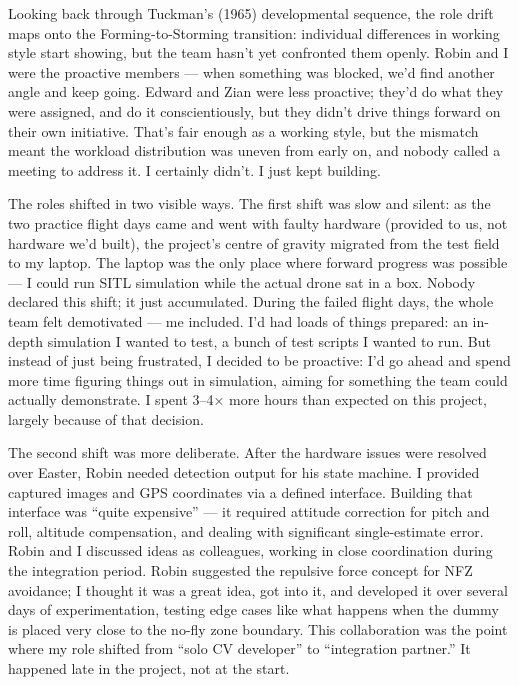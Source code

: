 Looking back through Tuckman's (1965) developmental sequence, the role drift maps onto the Forming-to-Storming transition: individual differences in working style start showing, but the team hasn't yet confronted them openly. Robin and I were the proactive members --- when something was blocked, we'd find another angle and keep going. Edward and Zian were less proactive; they'd do what they were assigned, and do it conscientiously, but they didn't drive things forward on their own initiative. That's fair enough as a working style, but the mismatch meant the workload distribution was uneven from early on, and nobody called a meeting to address it. I certainly didn't. I just kept building.

The roles shifted in two visible ways. The first shift was slow and silent: as the two practice flight days came and went with faulty hardware (provided to us, not hardware we'd built), the project's centre of gravity migrated from the test field to my laptop. The laptop was the only place where forward progress was possible --- I could run SITL simulation while the actual drone sat in a box. Nobody declared this shift; it just accumulated. During the failed flight days, the whole team felt demotivated --- me included. I'd had loads of things prepared: an in-depth simulation I wanted to test, a bunch of test scripts I wanted to run. But instead of just being frustrated, I decided to be proactive: I'd go ahead and spend more time figuring things out in simulation, aiming for something the team could actually demonstrate. I spent 3--4$\times$ more hours than expected on this project, largely because of that decision.

The second shift was more deliberate. After the hardware issues were resolved over Easter, Robin needed detection output for his state machine. I provided captured images and GPS coordinates via a defined interface. Building that interface was ``quite expensive'' --- it required attitude correction for pitch and roll, altitude compensation, and dealing with significant single-estimate error. Robin and I discussed ideas as colleagues, working in close coordination during the integration period. Robin suggested the repulsive force concept for NFZ avoidance; I thought it was a great idea, got into it, and developed it over several days of experimentation, testing edge cases like what happens when the dummy is placed very close to the no-fly zone boundary. This collaboration was the point where my role shifted from ``solo CV developer'' to ``integration partner.'' It happened late in the project, not at the start.


